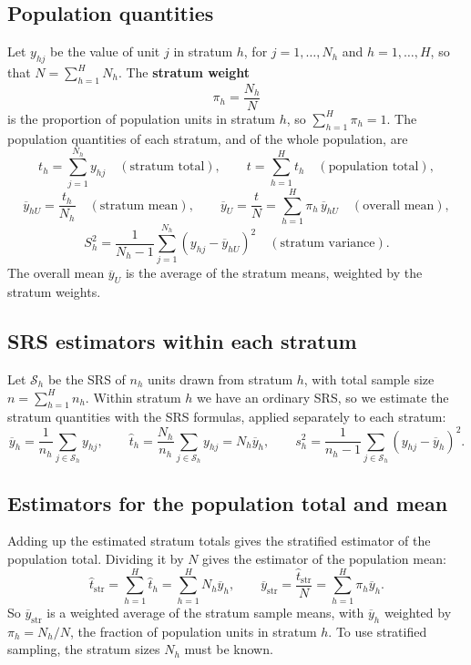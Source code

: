 \documentclass[
  letterpaper,
  DIV=11,
  numbers=noendperiod]{scrreprt}
\renewcommand{\[}{\begin{equation}}
\renewcommand{\]}{\end{equation}}
\begin{document}
\subsection{Population quantities}\label{population-quantities-1}

Let \(y_{hj}\) be the value of unit \(j\) in stratum \(h\), for
\(j = 1, \ldots, N_h\) and \(h = 1, \ldots, H\), so that
\(N = \sum_{h=1}^H N_h\). The \textbf{stratum weight} \[
\pi_h = \frac{N_h}{N}
\] is the proportion of population units in stratum \(h\), so
\(\sum_{h=1}^H \pi_h = 1\). The population quantities of each stratum,
and of the whole population, are \[
t_h = \sum_{j=1}^{N_h} y_{hj} \quad(\text{stratum total}), \qquad
t = \sum_{h=1}^H t_h \quad(\text{population total}),
\] \[
\overline y_{hU} = \frac{t_h}{N_h} \quad(\text{stratum mean}), \qquad
\overline y_U = \frac tN = \sum_{h=1}^H \pi_h\, \overline y_{hU} \quad(\text{overall mean}),
\] \[
S_h^2 = \frac{1}{N_h-1}\sum_{j=1}^{N_h}(y_{hj}-\overline y_{hU})^2 \quad(\text{stratum variance}).
\] The overall mean \(\overline y_U\) is the average of the stratum
means, weighted by the stratum weights.

\subsection{SRS estimators within each
stratum}\label{srs-estimators-within-each-stratum}

Let \(\mathcal S_h\) be the SRS of \(n_h\) units drawn from stratum
\(h\), with total sample size \(n = \sum_{h=1}^H n_h\). Within stratum
\(h\) we have an ordinary SRS, so we estimate the stratum quantities
with the SRS formulas, applied separately to each stratum: \[
\overline y_h = \frac{1}{n_h}\sum_{j\in\mathcal S_h} y_{hj}, \qquad
\hat t_h = \frac{N_h}{n_h}\sum_{j\in\mathcal S_h} y_{hj} = N_h \overline y_h, \qquad
s_h^2 = \frac{1}{n_h - 1}\sum_{j\in\mathcal S_h} (y_{hj}-\overline y_h)^2 .
\]

\subsection{Estimators for the population total and
mean}\label{estimators-for-the-population-total-and-mean}

Adding up the estimated stratum totals gives the stratified estimator of
the population total. Dividing it by \(N\) gives the estimator of the
population mean: \[
\boxed{
\hat t_{\text{str}} = \sum_{h=1}^H \hat t_h = \sum_{h=1}^H N_h \overline y_h,
\qquad
\overline y_{\text{str}} = \frac{\hat t_{\text{str}}}{N} = \sum_{h=1}^H \pi_h\overline y_h .}
\] So \(\overline y_{\text{str}}\) is a weighted average of the stratum
sample means, with \(\overline y_h\) weighted by \(\pi_h = N_h/N\), the
fraction of population units in stratum \(h\). To use stratified
sampling, the stratum sizes \(N_h\) must be known.
\end{document}

